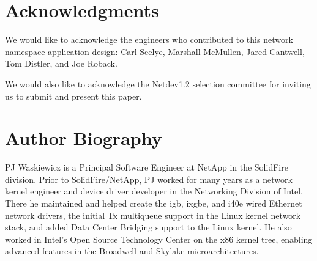 \documentclass[letterpaper]{article}
\begin{document}
\section{Acknowledgments}
We would like to acknowledge the engineers who contributed to this network namespace application design: Carl Seelye, Marshall McMullen, Jared Cantwell, Tom Distler, and Joe Roback.

We would also like to acknowledge the Netdev1.2 selection committee for inviting us to submit and present this paper.




\section{Author Biography}
PJ Waskiewicz is a Principal Software Engineer at NetApp in the SolidFire division. Prior to SolidFire/NetApp, PJ worked for many years as a network kernel engineer and device driver developer in the Networking Division of Intel. There he maintained and helped create the igb, ixgbe, and i40e wired Ethernet network drivers, the initial Tx multiqueue support in the Linux kernel network stack, and added Data Center Bridging support to the Linux kernel. He also worked in Intel's Open Source Technology Center on the x86 kernel tree, enabling advanced features in the Broadwell and Skylake microarchitectures.
\end{document}
